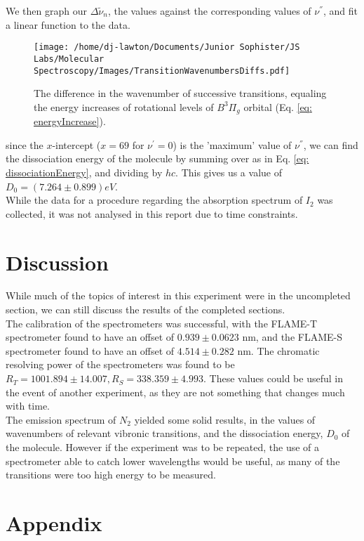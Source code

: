 \documentclass{article}
\begin{document}
We then graph our $\Delta\tilde{\nu}_n$, the values against the corresponding values of $\nu^{''}$, and fit a linear function to the data.\\
\begin{figure}[H]
    \centering
    \texttt{[image: /home/dj-lawton/Documents/Junior Sophister/JS Labs/Molecular Spectroscopy/Images/TransitionWavenumbersDiffs.pdf]}
    \caption{\label{fig:DeltaWavenumber} The difference in the wavenumber of successive transitions, equaling the energy increases of rotational levels of $B^3\Pi_g$ orbital (Eq. \ref{eq: energyIncrease}).}
\end{figure}
since the $x$-intercept ($x=69$ for $\nu^{\prime}=0$) is the 'maximum' value of $\nu^{''}$, we can find the dissociation energy of the molecule by summing over as in Eq. \ref{eq: dissociationEnergy}, and dividing by $hc$. This gives us a value of $D_0 = (7.264\pm0.899) eV$.\\

While the data for a procedure regarding the absorption spectrum of $I_2$ was collected, it was not analysed in this report due to time constraints.\\

\section{Discussion}
While much of the topics of interest in this experiment were in the uncompleted section, we can still discuss the results of the completed sections.\\
\indent The calibration of the spectrometers was successful, with the FLAME-T spectrometer found to have an offset of $0.939\pm0.0623$ nm, and the FLAME-S spectrometer found to have an offset of $4.514\pm0.282$ nm. The chromatic resolving power of the spectrometers was found to be $R_T = 1001.894\pm14.007, R_S = 338.359\pm4.993$. These values could be useful in the event of another experiment, as they are not something that changes much with time.\\
\indent The emission spectrum of $N_2$ yielded some solid results, in the values of wavenumbers of relevant vibronic transitions, and the dissociation energy, $D_0$ of the molecule. However if the experiment was to be repeated, the use of a spectrometer able to catch lower wavelengths would be useful, as many of the transitions were too high energy to be measured.\\

\newpage
\section{Appendix}
\end{document}
